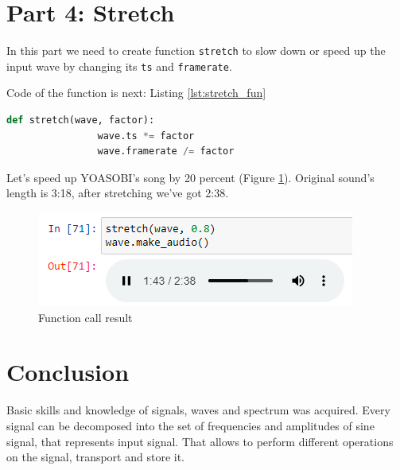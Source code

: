 \documentclass[a4paper]{article}
\begin{document}
    \newpage
        \section{Part 4: Stretch}
        
            In this part we need to create function \texttt{stretch} to slow down or speed up the input wave by changing its \texttt{ts} and \texttt{framerate}.
            
            Code of the function is next: Listing \ref{lst:stretch_fun}
            
            \begin{lstlisting}[language=Python,caption=Definition of the function,label={lst:stretch_fun}]
                def stretch(wave, factor):
                wave.ts *= factor
                wave.framerate /= factor
            \end{lstlisting}
            
            Let's speed up YOASOBI's song by 20 percent (Figure \ref{fig:stretch_audio_res}). Original sound's length is 3:18, after stretching we've got 2:38.
            
            \begin{figure}[H]
                \centering
                \includegraphics[width=\textwidth]{img/stretch_result.png}
                \caption{Function call result}
                \label{fig:stretch_audio_res}
            \end{figure}
    
    \newpage
        \section{Conclusion}
            Basic skills and knowledge of signals, waves and spectrum was acquired. Every signal can be decomposed into the set of frequencies and amplitudes of sine signal, that represents input signal. That allows to perform different operations on the signal, transport and store it.
            
            
    
\end{document}
